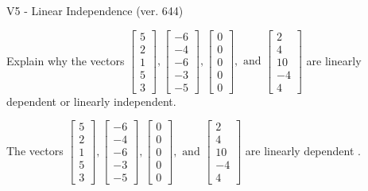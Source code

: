 \begin{exercise}
  \begin{exerciseTitle}V5 - Linear Independence (ver. 644)\end{exerciseTitle}
  \begin{exerciseStatement}
    Explain why the vectors \(\left[\begin{array}{r}
5 \\
2 \\
1 \\
5 \\
3
\end{array}\right] , \left[\begin{array}{r}
-6 \\
-4 \\
-6 \\
-3 \\
-5
\end{array}\right] , \left[\begin{array}{r}
0 \\
0 \\
0 \\
0 \\
0
\end{array}\right] , \text{ and } \left[\begin{array}{r}
2 \\
4 \\
10 \\
-4 \\
4
\end{array}\right]\) are linearly dependent or linearly independent.	


  \end{exerciseStatement}
  \begin{exerciseAnswer}
   The vectors \(\left[\begin{array}{r}
5 \\
2 \\
1 \\
5 \\
3
\end{array}\right] , \left[\begin{array}{r}
-6 \\
-4 \\
-6 \\
-3 \\
-5
\end{array}\right] , \left[\begin{array}{r}
0 \\
0 \\
0 \\
0 \\
0
\end{array}\right] , \text{ and } \left[\begin{array}{r}
2 \\
4 \\
10 \\
-4 \\
4
\end{array}\right]\) are 
  	 linearly dependent  .
  


  \end{exerciseAnswer}
\end{exercise}
